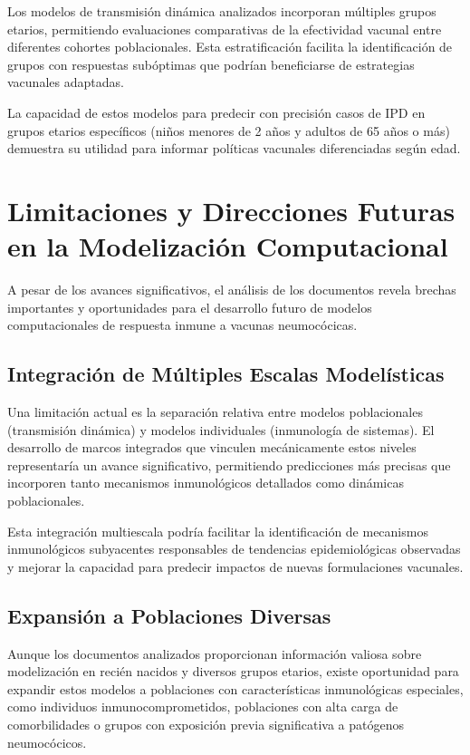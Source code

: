 Los modelos de transmisión dinámica analizados incorporan múltiples grupos etarios, permitiendo evaluaciones comparativas de la efectividad vacunal entre diferentes cohortes poblacionales. Esta estratificación facilita la identificación de grupos con respuestas subóptimas que podrían beneficiarse de estrategias vacunales adaptadas.

La capacidad de estos modelos para predecir con precisión casos de IPD en grupos etarios específicos (niños menores de 2 años y adultos de 65 años o más) demuestra su utilidad para informar políticas vacunales diferenciadas según edad.

\section{Limitaciones y Direcciones Futuras en la Modelización Computacional}

A pesar de los avances significativos, el análisis de los documentos revela brechas importantes y oportunidades para el desarrollo futuro de modelos computacionales de respuesta inmune a vacunas neumocócicas.

\subsection{Integración de Múltiples Escalas Modelísticas}

Una limitación actual es la separación relativa entre modelos poblacionales (transmisión dinámica) y modelos individuales (inmunología de sistemas). El desarrollo de marcos integrados que vinculen mecánicamente estos niveles representaría un avance significativo, permitiendo predicciones más precisas que incorporen tanto mecanismos inmunológicos detallados como dinámicas poblacionales.

Esta integración multiescala podría facilitar la identificación de mecanismos inmunológicos subyacentes responsables de tendencias epidemiológicas observadas y mejorar la capacidad para predecir impactos de nuevas formulaciones vacunales.

\subsection{Expansión a Poblaciones Diversas}

Aunque los documentos analizados proporcionan información valiosa sobre modelización en recién nacidos y diversos grupos etarios, existe oportunidad para expandir estos modelos a poblaciones con características inmunológicas especiales, como individuos inmunocomprometidos, poblaciones con alta carga de comorbilidades o grupos con exposición previa significativa a patógenos neumocócicos.

